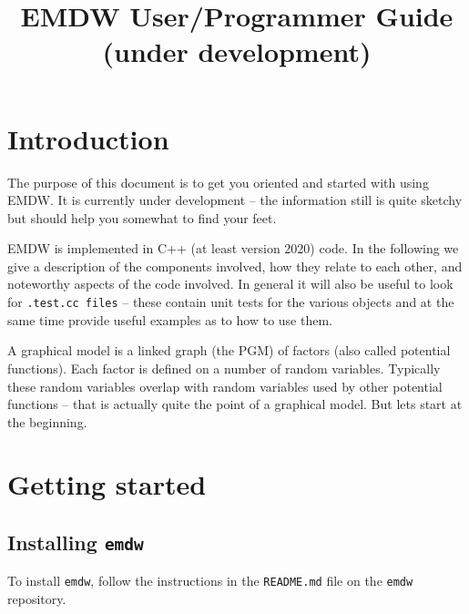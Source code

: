 \documentclass[english]{article}
\begin{document}
\title{EMDW User/Programmer Guide \\
(under development)}

\maketitle
\tableofcontents{}
\pagebreak

\section*{Introduction}

The purpose of this document is to get you oriented and started with
using EMDW. It is currently under development -- the information still
is quite sketchy but should help you somewhat to find your feet.

EMDW is implemented in C++ (at least version 2020) code. In the following
we give a description of the components involved, how they relate
to each other, and noteworthy aspects of the code involved. In general
it will also be useful to look for \texttt{.test.cc files} -- these contain
unit tests for the various objects and at the same time provide useful
examples as to how to use them.

A graphical model is a linked graph (the PGM) of factors (also called
potential functions). Each factor is defined on a number of random
variables. Typically these random variables overlap with random variables
used by other potential functions -- that is actually quite the point
of a graphical model. But lets start at the beginning.


\section{Getting started} \label{sec:getting_started}

\subsection{Installing \texttt{emdw}}
To install \texttt{emdw}, follow the instructions in the
\texttt{README.md} file on the \texttt{emdw} repository.
\end{document}
